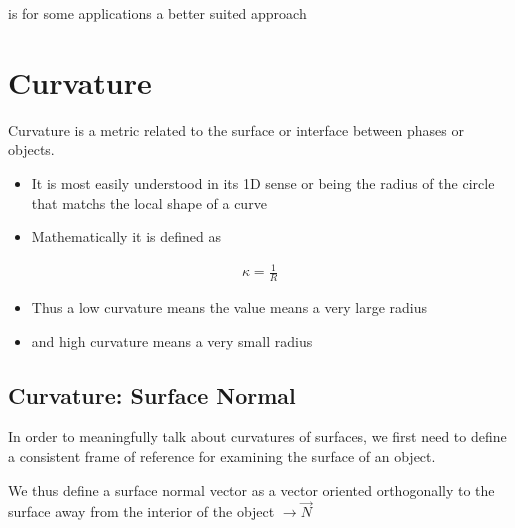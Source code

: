\documentclass[letterpaper,10pt,english]{sphinxmanual}
\begin{document}
\sphinxAtStartPar
{} is for some applications a better suited approach


\chapter{Curvature}
\label{\detokenize{06-AdvancedShapeAndTexture:curvature}}
\sphinxAtStartPar
Curvature is a metric related to the surface or interface between phases or objects.
\begin{itemize}
\item {} 
\sphinxAtStartPar
It is most easily understood in its 1D sense or being the radius of the circle that matchs the local shape of a curve

\end{itemize}

\sphinxAtStartPar
{}
\begin{itemize}
\item {} 
\sphinxAtStartPar
Mathematically it is defined as

\end{itemize}
\begin{equation*}
\begin{split} \kappa = \frac{1}{R} \end{split}
\end{equation*}\begin{itemize}
\item {} 
\sphinxAtStartPar
Thus a low curvature means the value means a very large radius

\item {} 
\sphinxAtStartPar
and high curvature means a very small radius

\end{itemize}


\section{Curvature: Surface Normal}
\label{\detokenize{06-AdvancedShapeAndTexture:curvature-surface-normal}}
\sphinxAtStartPar
In order to meaningfully talk about curvatures of surfaces, we first need to define a consistent frame of reference for examining the surface of an object.

\sphinxAtStartPar
We thus define a surface normal vector as a vector oriented orthogonally to the surface away from the interior of the object \(\rightarrow \vec{N}\)
\end{document}
